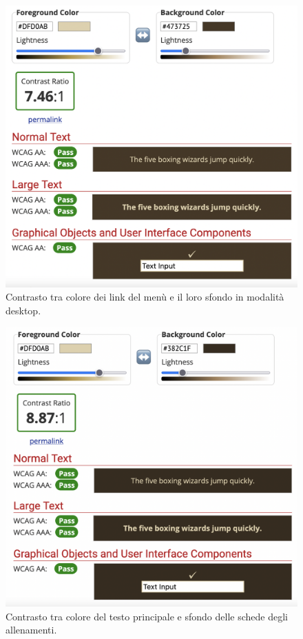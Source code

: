 \documentclass[a4paper]{article}
\begin{document}
	\begin{figure}[H]
		\centering
		\includegraphics[scale=0.3]{immagini/controllo-colori/dark-mode/testo-principale_background-menu.png}
		\caption{Contrasto tra colore dei link del menù e il loro sfondo in modalità desktop.}
	\end{figure}

	\begin{figure}[H]
		\centering
		\includegraphics[scale=0.3]{immagini/controllo-colori/dark-mode/testo-principale_sfondo-article-p.png}
		\caption{Contrasto tra colore del testo principale e sfondo delle schede degli allenamenti.}
	\end{figure}
\end{document}
